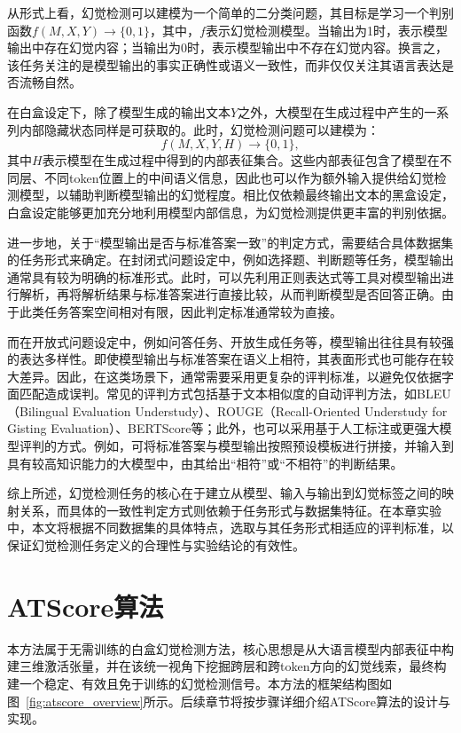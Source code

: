 从形式上看，幻觉检测可以建模为一个简单的二分类问题，其目标是学习一个判别函数$f(M, X, Y) \rightarrow \{0, 1\}$，其中，$f$表示幻觉检测模型。当输出为1时，表示模型输出中存在幻觉内容；当输出为0时，表示模型输出中不存在幻觉内容。换言之，该任务关注的是模型输出的事实正确性或语义一致性，而非仅仅关注其语言表达是否流畅自然。

在白盒设定下，除了模型生成的输出文本$Y$之外，大模型在生成过程中产生的一系列内部隐藏状态同样是可获取的。此时，幻觉检测问题可以建模为：
\begin{equation}
f(M,X,Y,H)\rightarrow \{0,1\},
\end{equation}
其中$H$表示模型在生成过程中得到的内部表征集合。这些内部表征包含了模型在不同层、不同token位置上的中间语义信息，因此也可以作为额外输入提供给幻觉检测模型，以辅助判断模型输出的幻觉程度。相比仅依赖最终输出文本的黑盒设定，白盒设定能够更加充分地利用模型内部信息，为幻觉检测提供更丰富的判别依据。

进一步地，关于“模型输出是否与标准答案一致”的判定方式，需要结合具体数据集的任务形式来确定。在封闭式问题设定中，例如选择题、判断题等任务，模型输出通常具有较为明确的标准形式。此时，可以先利用正则表达式等工具对模型输出进行解析，再将解析结果与标准答案进行直接比较，从而判断模型是否回答正确。由于此类任务答案空间相对有限，因此判定标准通常较为直接。

而在开放式问题设定中，例如问答任务、开放生成任务等，模型输出往往具有较强的表达多样性。即使模型输出与标准答案在语义上相符，其表面形式也可能存在较大差异。因此，在这类场景下，通常需要采用更复杂的评判标准，以避免仅依据字面匹配造成误判。常见的评判方式包括基于文本相似度的自动评判方法，如BLEU（Bilingual Evaluation Understudy）\cite{papineni2002bleu}、ROUGE（Recall-Oriented Understudy for Gisting Evaluation）\cite{lin2004rouge}、BERTScore\cite{zhang2020bertscore}等；此外，也可以采用基于人工标注或更强大模型评判的方式。例如，可将标准答案与模型输出按照预设模板进行拼接，并输入到具有较高知识能力的大模型中，由其给出“相符”或“不相符”的判断结果。

综上所述，幻觉检测任务的核心在于建立从模型、输入与输出到幻觉标签之间的映射关系，而具体的一致性判定方式则依赖于任务形式与数据集特征。在本章实验中，本文将根据不同数据集的具体特点，选取与其任务形式相适应的评判标准，以保证幻觉检测任务定义的合理性与实验结论的有效性。

\section{ATScore算法}

本方法属于无需训练的白盒幻觉检测方法，核心思想是从大语言模型内部表征中构建三维激活张量，并在该统一视角下挖掘跨层和跨token方向的幻觉线索，最终构建一个稳定、有效且免于训练的幻觉检测信号。本方法的框架结构图如图~\ref{fig:atscore_overview}所示。后续章节将按步骤详细介绍ATScore算法的设计与实现。


